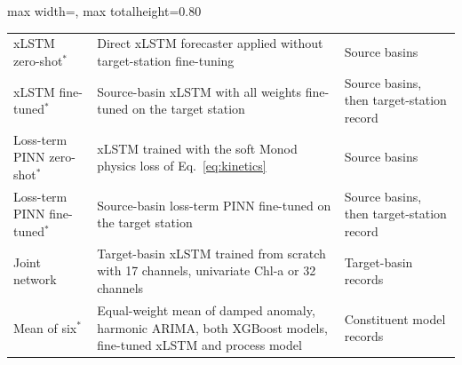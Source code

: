 \begin{table}[tbp]
\begin{adjustbox}{max width=\textwidth, max totalheight=0.80\textheight}
\begin{tabular}{@{}>{\raggedright\arraybackslash}p{}>{\raggedright\arraybackslash}p{}>{\raggedright\arraybackslash}p{}@{}}
xLSTM zero-shot$^{*}$ & Direct xLSTM forecaster applied without target-station fine-tuning & Source basins \\
xLSTM fine-tuned$^{*}$ & Source-basin xLSTM with all weights fine-tuned on the target station & Source basins, then target-station record \\
Loss-term PINN zero-shot$^{*}$ & xLSTM trained with the soft Monod physics loss of Eq.~\eqref{eq:kinetics} & Source basins \\
Loss-term PINN fine-tuned$^{*}$ & Source-basin loss-term PINN fine-tuned on the target station & Source basins, then target-station record \\
Joint network & Target-basin xLSTM trained from scratch with 17 channels, univariate Chl-a or 32 channels & Target-basin records \\
\midrule
Mean of six$^{*}$ & Equal-weight mean of damped anomaly, harmonic ARIMA, both XGBoost models, fine-tuned xLSTM and process model & Constituent model records \\
\bottomrule
\end{tabular}
\end{adjustbox}
\end{table}
